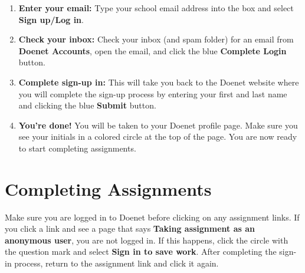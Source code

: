 \documentclass[11pt, letterpaper]{article}
\begin{document}
\begin{enumerate}[leftmargin=1.5em, itemsep=0.5em]
    \item \textbf{Enter your email:} Type your school email address into the box and select \textbf{Sign up/Log in}.
    
    \item \textbf{Check your inbox:} Check your inbox (and spam folder) for an email from \textbf{Doenet Accounts}, open the email, and click the blue \textbf{Complete Login} button.
    
    \item \textbf{Complete sign-up in:} This will take you back to the Doenet website where you will complete the sign-up process by entering your first and last name and clicking the blue \textbf{Submit} button.

    \item \textbf{You're done!} You will be taken to your Doenet profile page. Make sure you see your initials in a colored circle at the top of the page. You are now ready to start completing assignments.
\end{enumerate}

\section*{Completing Assignments}

Make sure you are logged in to Doenet before clicking on any assignment links. If you click a link and see a page that says \textbf{Taking assignment as an anonymous user}, you are not logged in. If this happens, click the circle with the question mark and select \textbf{Sign in to save work}. After completing the sign-in process, return to the assignment link and click it again.
\end{document}
